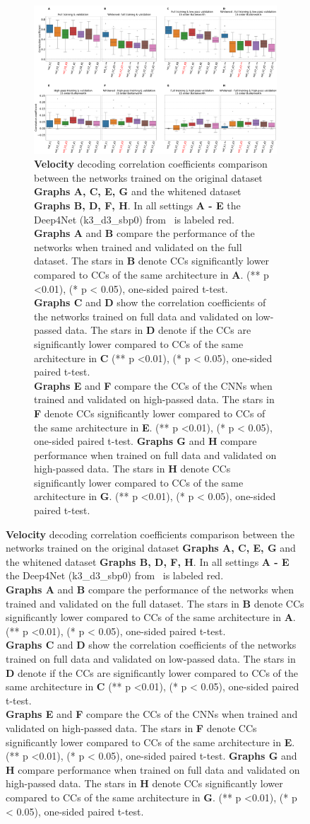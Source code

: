 \begin{figure}[!hpbp]
\begin{subfigure}[a]{\textwidth}
   \includegraphics[width=1\linewidth]{img/ch4/vel-pw-vs-non-pw-performance}
   \caption{\textbf{Velocity} decoding correlation coefficients comparison between the networks trained on the original dataset \textbf{Graphs A, C, E, G} and the whitened dataset \textbf{Graphs B, D, F, H}.
   In all settings \textbf{A - E} the Deep4Net (k3\_d3\_sbp0) from~\cite{Hammer-2021} is labeled red.
   \\ \textbf{Graphs A} and \textbf{B} compare the performance of the networks when trained and validated on the full dataset.
   The stars in \textbf{B} denote CCs significantly lower compared to CCs of the same architecture in \textbf{A}. (** p <0.01), (* p < 0.05), one-sided paired t-test.
   \\\textbf{Graphs C} and \textbf{D} show the correlation coefficients of the networks trained on full data and validated on low-passed data.
   The stars in \textbf{D} denote if the CCs are significantly lower compared to CCs of the same architecture in \textbf{C} (** p <0.01), (* p < 0.05), one-sided paired t-test.
   \\\textbf{Graphs E} and \textbf{F} compare the CCs of the CNNs when trained and validated on high-passed data.
   The stars in \textbf{F} denote CCs significantly lower compared to CCs of the same architecture in \textbf{E}. (** p <0.01), (* p < 0.05), one-sided paired t-test.
   \textbf{Graphs G} and \textbf{H} compare performance when trained on full data and validated on high-passed data.
   The stars in \textbf{H} denote CCs significantly lower compared to CCs of the same architecture in \textbf{G}. (** p <0.01), (* p < 0.05), one-sided paired t-test.}
\end{subfigure}\label{fig:vel-pw-performance}


\end{figure}
